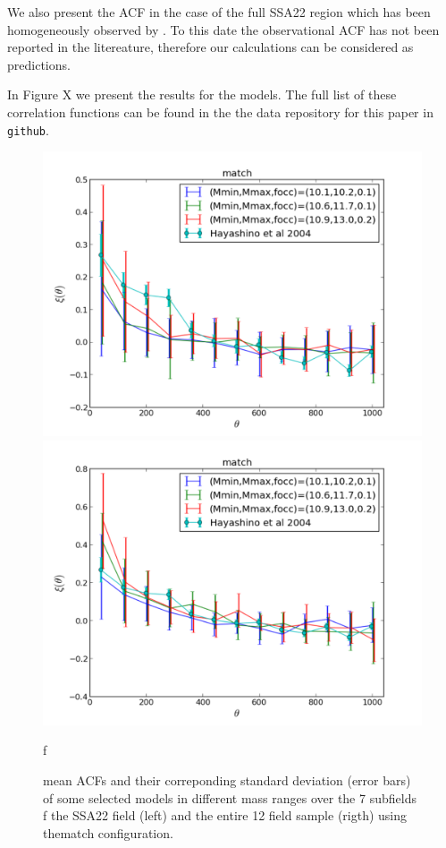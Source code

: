 \documentclass[usenatbib]{mn2e}
\begin{document}
We also present the ACF in the case of the full SSA22
region which has been homogeneously observed by \citep{Yamada2012}. To
this date the observational ACF has not been reported in the
litereature, therefore our calculations can be considered as
predictions. 

In Figure X we present the results for the models. The full list of
these correlation functions can be found in the the data repository
for this paper in \verb"github". 



\begin{figure}
\begin{center}
\includegraphics[width=0.46\linewidth,angle=0]{./plots/match_large_correlation_selected_models.pdf}
\hspace{5mm}
\includegraphics[width=0.46\linewidth,angle=0]{./plots/match_full_correlation_selected_models.pdf}
\end{center} f
\caption{ mean ACFs   and their correponding standard deviation (error
  bars)  of some selected models in different mass ranges over the 7
  subfields  f the SSA22 field (left) and the entire 12 field sample
  (rigth) using thematch
  configuration. \label{figure:correlation_match} }  
  \end{figure}
\end{document}
